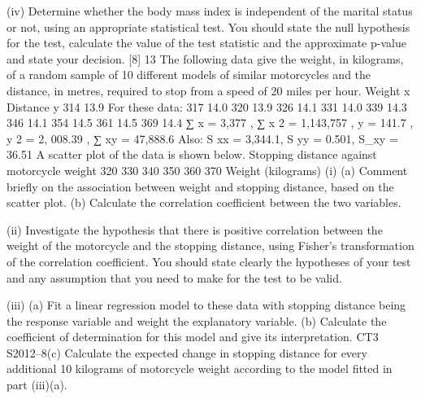 \documentclass[a4paper,12pt]{article}
\begin{document}
(iv) Determine whether the body mass index is independent of the marital status or not, using an appropriate statistical test. You should state the null hypothesis for the test, calculate the value of the test statistic and the approximate
p-value and state your decision.
[8]
13
The following data give the weight, in kilograms, of a random sample of 10 different
models of similar motorcycles and the distance, in metres, required to stop from a
speed of 20 miles per hour.
Weight x
Distance y
314
13.9
For these data:
317
14.0
320
13.9
326
14.1
331
14.0
339
14.3
346
14.1
354
14.5
361
14.5
369
14.4
∑ x = 3,377 , ∑ x 2 = 1,143,757 , \sum y = 141.7 ,
\sum y 2 = 2, 008.39 , ∑ xy = 47,888.6
Also: S xx = 3,344.1, S yy = 0.501, S_{xy} = 36.51
A scatter plot of the data is shown below.
Stopping distance against motorcycle weight
320
330
340
350
360
370
Weight (kilograms)
(i)
(a) Comment briefly on the association between weight and stopping distance, based on the scatter plot.
(b) Calculate the correlation coefficient between the two variables.

(ii) Investigate the hypothesis that there is positive correlation between the weight of the motorcycle and the stopping distance, using Fisher’s transformation of the correlation coefficient. You should state clearly the hypotheses of your
test and any assumption that you need to make for the test to be valid.

(iii) (a)
Fit a linear regression model to these data with stopping distance being the response variable and weight the explanatory variable.
(b)
Calculate the coefficient of determination for this model and give its interpretation.
CT3 S2012–8(c)
Calculate the expected change in stopping distance for every additional 10 kilograms of motorcycle weight according to the model fitted in
part (iii)(a).
\end{document}
